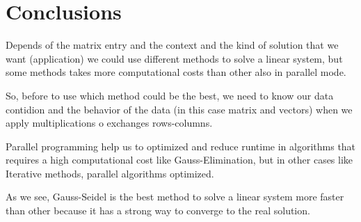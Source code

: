 \documentclass[letterpaper,12pt]{article}
\begin{document}
\section{Conclusions}

Depends of the matrix entry and the context and the kind of solution that we want (application) we could use different methods to solve a linear system, but some methods takes more computational costs than other also in parallel mode.

So, before to use which method could be the best, we need to know our data contidion and the behavior of the data (in this case matrix and vectors) when we apply multiplications o exchanges rows-columns.

Parallel programming help us to optimized and reduce runtime in algorithms that requires a high computational cost like Gauss-Elimination, but in other cases like Iterative methods, parallel algorithms optimized.

As we see, Gauss-Seidel is the best method to solve a linear system more faster than other because it has a strong way to converge to the real solution.



\end{document}
